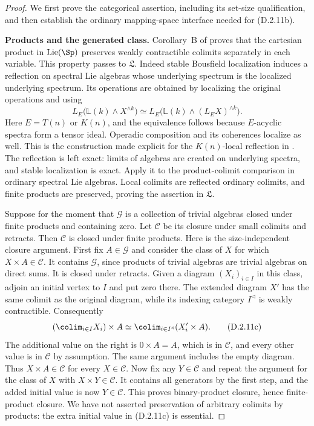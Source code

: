 \begin{proof}
We first prove the categorical assertion, including its set-size
qualification, and then establish the ordinary mapping-space
interface needed for \textup{(D.2.11b)}.

\medskip\noindent
\textbf{Products and the generated class.}
Corollary~B of \citet{I_BlansHeuts2026} proves that the cartesian
product in $\operatorname{Lie}(\Sp)$ preserves weakly contractible
colimits separately in each variable. This property passes to
$\mathfrak L$. Indeed stable Bousfield localization induces a
reflection on spectral Lie algebras whose underlying spectrum is
the localized underlying spectrum. Its operations are obtained
by localizing the original operations and using
\[
 L_E\bigl(\mathbb L(k)\wedge X^{\wedge k}\bigr)
 \simeq
 L_E\bigl(\mathbb L(k)\wedge(L_EX)^{\wedge k}\bigr).
\]
Here $E=T(n)$ or $K(n)$, and the equivalence follows because
$E$-acyclic spectra form a tensor ideal. Operadic composition and
its coherences localize as well. This is the construction made
explicit for the $K(n)$-local reflection in
\cite[Proposition~4.26]{I_Heuts2021}.
The reflection is left exact: limits of algebras are created on
underlying spectra, and stable localization is exact. Apply it
to the product-colimit comparison in ordinary spectral Lie
algebras. Local colimits are reflected ordinary colimits, and
finite products are preserved, proving the assertion in
$\mathfrak L$.

Suppose for the moment that $\mathcal G$ is a collection of
trivial algebras closed under finite products and containing
zero. Let $\mathcal C$ be its closure under small colimits and
retracts. Then $\mathcal C$ is closed under finite products.
Here is the size-independent closure argument. First fix
$A\in\mathcal G$ and consider the class of $X$ for which
$X\times A\in\mathcal C$. It contains $\mathcal G$, since
products of trivial algebras are trivial algebras on direct sums.
It is closed under retracts. Given a diagram $(X_i)_{i\in I}$
in this class, adjoin an initial vertex to $I$ and put zero
there. The extended diagram $X'$ has the same colimit as the
original diagram, while its indexing category $I^{\triangleleft}$
is weakly contractible. Consequently
\[
 \left(\colim_{i\in I}X_i\right)\times A
 \simeq
 \colim_{i\in I^{\triangleleft}}(X'_i\times A).
 \tag{D.2.11c}
\]
The additional value on the right is $0\times A=A$, which is in
$\mathcal C$, and every other value is in $\mathcal C$ by
assumption. The same argument includes the empty diagram.
Thus $X\times A\in\mathcal C$ for every $X\in\mathcal C$.
Now fix any $Y\in\mathcal C$ and repeat the argument for the
class of $X$ with $X\times Y\in\mathcal C$. It contains all
generators by the first step, and the added initial value is
now $Y\in\mathcal C$. This proves binary-product closure, hence
finite-product closure. We have not asserted preservation of
arbitrary colimits by products: the extra initial value in
\textup{(D.2.11c)} is essential.


\end{proof}
